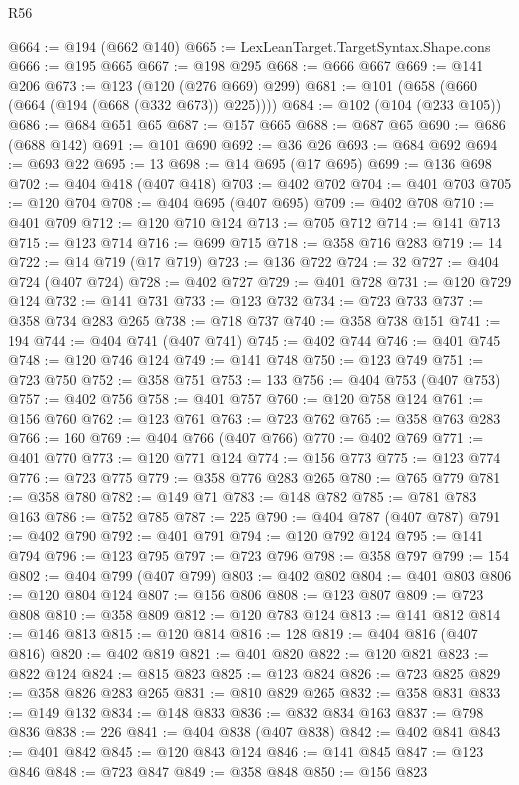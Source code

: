 \begin{lexlean}{R56}
\begin{coremodule}
@664 := @194 (@662 @140)
@665 := LexLeanTarget.TargetSyntax.Shape.cons
@666 := @195 @665
@667 := @198 @295
@668 := @666 @667
@669 := @141 @206
@673 := @123 (@120 (@276 @669) @299)
@681 := @101 (@658 (@660 (@664 (@194 (@668 (@332 @673)) @225))))
@684 := @102 (@104 (@233 @105))
@686 := @684 @651 @65
@687 := @157 @665
@688 := @687 @65
@690 := @686 (@688 @142)
@691 := @101 @690
@692 := @36 @26
@693 := @684 @692
@694 := @693 @22
@695 := 13
@698 := @14 @695 (@17 @695)
@699 := @136 @698
@702 := @404 @418 (@407 @418)
@703 := @402 @702
@704 := @401 @703
@705 := @120 @704
@708 := @404 @695 (@407 @695)
@709 := @402 @708
@710 := @401 @709
@712 := @120 @710 @124
@713 := @705 @712
@714 := @141 @713
@715 := @123 @714
@716 := @699 @715
@718 := @358 @716 @283
@719 := 14
@722 := @14 @719 (@17 @719)
@723 := @136 @722
@724 := 32
@727 := @404 @724 (@407 @724)
@728 := @402 @727
@729 := @401 @728
@731 := @120 @729 @124
@732 := @141 @731
@733 := @123 @732
@734 := @723 @733
@737 := @358 @734 @283 @265
@738 := @718 @737
@740 := @358 @738 @151
@741 := 194
@744 := @404 @741 (@407 @741)
@745 := @402 @744
@746 := @401 @745
@748 := @120 @746 @124
@749 := @141 @748
@750 := @123 @749
@751 := @723 @750
@752 := @358 @751
@753 := 133
@756 := @404 @753 (@407 @753)
@757 := @402 @756
@758 := @401 @757
@760 := @120 @758 @124
@761 := @156 @760
@762 := @123 @761
@763 := @723 @762
@765 := @358 @763 @283
@766 := 160
@769 := @404 @766 (@407 @766)
@770 := @402 @769
@771 := @401 @770
@773 := @120 @771 @124
@774 := @156 @773
@775 := @123 @774
@776 := @723 @775
@779 := @358 @776 @283 @265
@780 := @765 @779
@781 := @358 @780
@782 := @149 @71
@783 := @148 @782
@785 := @781 @783 @163
@786 := @752 @785
@787 := 225
@790 := @404 @787 (@407 @787)
@791 := @402 @790
@792 := @401 @791
@794 := @120 @792 @124
@795 := @141 @794
@796 := @123 @795
@797 := @723 @796
@798 := @358 @797
@799 := 154
@802 := @404 @799 (@407 @799)
@803 := @402 @802
@804 := @401 @803
@806 := @120 @804 @124
@807 := @156 @806
@808 := @123 @807
@809 := @723 @808
@810 := @358 @809
@812 := @120 @783 @124
@813 := @141 @812
@814 := @146 @813
@815 := @120 @814
@816 := 128
@819 := @404 @816 (@407 @816)
@820 := @402 @819
@821 := @401 @820
@822 := @120 @821
@823 := @822 @124
@824 := @815 @823
@825 := @123 @824
@826 := @723 @825
@829 := @358 @826 @283 @265
@831 := @810 @829 @265
@832 := @358 @831
@833 := @149 @132
@834 := @148 @833
@836 := @832 @834 @163
@837 := @798 @836
@838 := 226
@841 := @404 @838 (@407 @838)
@842 := @402 @841
@843 := @401 @842
@845 := @120 @843 @124
@846 := @141 @845
@847 := @123 @846
@848 := @723 @847
@849 := @358 @848
@850 := @156 @823

\end{coremodule}
\end{lexlean}
